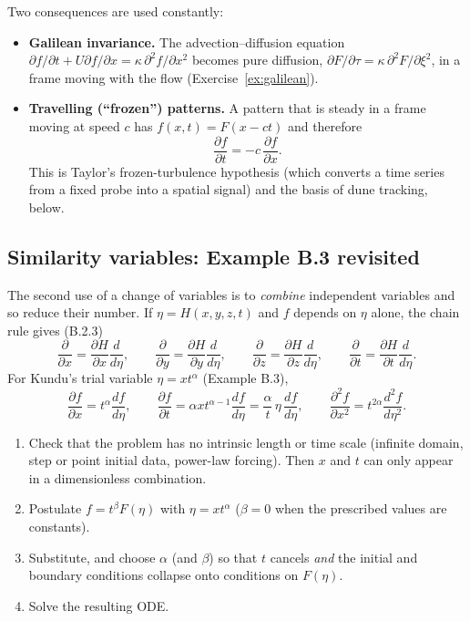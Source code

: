 \documentclass[11pt,letterpaper]{article}
\numberwithin{equation}{section}
\newcommand{\pd}[2]{\frac{\partial #1}{\partial #2}}
\newcommand{\pdd}[2]{\frac{\partial^2 #1}{\partial #2^2}}
\newcommand{\od}[2]{\frac{d #1}{d #2}}
\begin{document}
Two consequences are used constantly:
\begin{itemize}
  \item \textbf{Galilean invariance.} The advection--diffusion equation
        $\partial f/\partial t+U\partial f/\partial x=\kappa\,\partial^2f/\partial x^2$ becomes pure diffusion,
        $\partial F/\partial\tau=\kappa\,\partial^2F/\partial\xi^2$, in a frame moving with the flow (Exercise~\ref{ex:galilean}).
  \item \textbf{Travelling (``frozen'') patterns.} A pattern that is steady in a frame moving at speed $c$ has
        $f(x,t)=F(x-ct)$ and therefore
        \begin{equation}\label{eq:frozen}
        \pd{f}{t}=-c\,\pd{f}{x}.
        \end{equation}
        This is Taylor's frozen-turbulence hypothesis (which converts a time series from a fixed probe into a spatial
        signal) and the basis of dune tracking, below.
\end{itemize}

\subsection{Similarity variables: Example B.3 revisited}
The second use of a change of variables is to \emph{combine} independent variables and so reduce their number.
If $\eta=H(x,y,z,t)$ and $f$ depends on $\eta$ alone, the chain rule gives \textcolor{srcpurple}{(B.2.3)}
\begin{equation}
\pd{}{x}=\pd{H}{x}\od{}{\eta},\qquad \pd{}{y}=\pd{H}{y}\od{}{\eta},\qquad\pd{}{z}=\pd{H}{z}\od{}{\eta},\qquad
\pd{}{t}=\pd{H}{t}\od{}{\eta}.
\end{equation}
For Kundu's trial variable $\eta=xt^{\alpha}$ (Example B.3),
\begin{equation}\label{eq:B3ex}
\pd{f}{x}=t^{\alpha}\od{f}{\eta},\qquad \pd{f}{t}=\alpha xt^{\alpha-1}\od{f}{\eta}=\frac{\alpha}{t}\,\eta\,\od{f}{\eta},\qquad
\pdd{f}{x}=t^{2\alpha}\frac{d^2f}{d\eta^2}.
\end{equation}

\begin{keyidea}
\begin{enumerate}[label=\arabic*.,leftmargin=1.6em]
  \item Check that the problem has no intrinsic length or time scale (infinite domain, step or point initial data,
        power-law forcing). Then $x$ and $t$ can only appear in a dimensionless combination.
  \item Postulate $f=t^{\beta}F(\eta)$ with $\eta=xt^{\alpha}$ ($\beta=0$ when the prescribed values are constants).
  \item Substitute, and choose $\alpha$ (and $\beta$) so that $t$ cancels \emph{and} the initial and boundary
        conditions collapse onto conditions on $F(\eta)$.
  \item Solve the resulting ODE.
\end{enumerate}
\end{keyidea}
\end{document}
